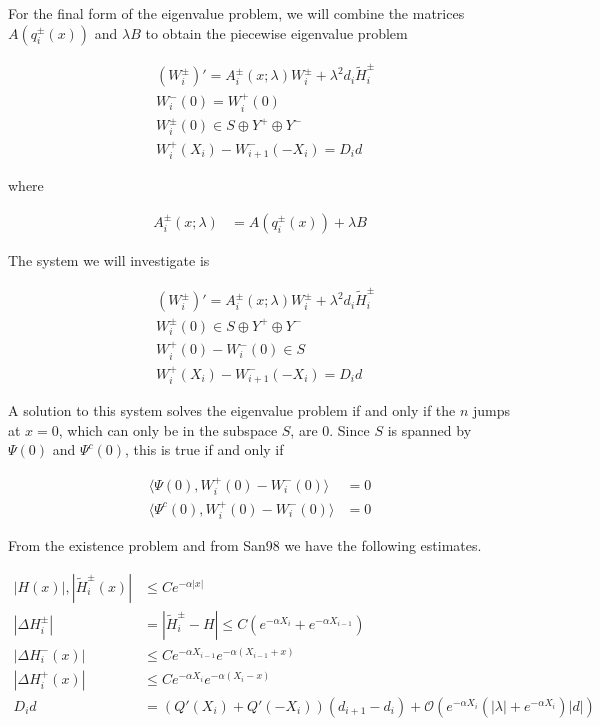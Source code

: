 \documentclass[12pt]{article}
\begin{document}
For the final form of the eigenvalue problem, we will combine the matrices $A( q_i^\pm(x) )$ and $\lambda B$ to obtain the piecewise eigenvalue problem

\begin{align*}
&(W_i^\pm)' = A_i^\pm(x; \lambda) W_i^\pm + \lambda^2 d_i \tilde{H}_i^\pm \\
&W_i^-(0) = W_i^+(0) \\
&W_i^\pm(0) \in S \oplus Y^+ \oplus Y^- \\
&W_i^+(X_i) - W_{i+1}^-(-X_i) = D_i d
\end{align*}

where

\begin{align*}
A_i^\pm(x; \lambda) &= A( q_i^\pm(x) ) + \lambda B 
\end{align*}

The system we will investigate is 

\begin{align*}
&(W_i^\pm)' = A_i^\pm(x; \lambda) W_i^\pm + \lambda^2 d_i \tilde{H}_i^\pm \\
&W_i^\pm(0) \in S \oplus Y^+ \oplus Y^- \\
&W_i^+(0) - W_i^-(0) \in S \\
&W_i^+(X_i) - W_{i+1}^-(-X_i) = D_i d
\end{align*}

A solution to this system solves the eigenvalue problem if and only if the $n$ jumps at $x = 0$, which can only be in the subspace $S$, are 0. Since $S$ is spanned by $\Psi(0)$ and $\Psi^c(0)$, this is true if and only if 

\begin{align*}
\langle \Psi(0), W_i^+(0) - W_i^-(0) \rangle &= 0 \\
\langle \Psi^c(0), W_i^+(0) - W_i^-(0) \rangle &= 0
\end{align*}

From the existence problem and from San98 we have the following estimates.

\begin{align*}
|H(x)|, |\tilde{H}_i^\pm(x)| &\leq C e^{-\alpha |x|} \\
|\Delta H_i^\pm| &= |\tilde{H}_i^\pm - H| \leq C(e^{-\alpha X_i} + e^{-\alpha X_{i-1}} ) \\
|\Delta H_i^-(x)| &\leq C e^{-\alpha X_{i-1}} e^{-\alpha(X_{i-1} + x) } \\
|\Delta H_i^+(x)| &\leq C e^{-\alpha X_i} e^{-\alpha(X_i - x) } \\
D_i d &= ( Q'(X_i) + Q'(-X_i))(d_{i+1} - d_i ) + \mathcal{O} \left( e^{-\alpha X_i} \left( |\lambda| +  e^{-\alpha X_i}  \right) |d| \right) \\
\end{align*}
\end{document}
